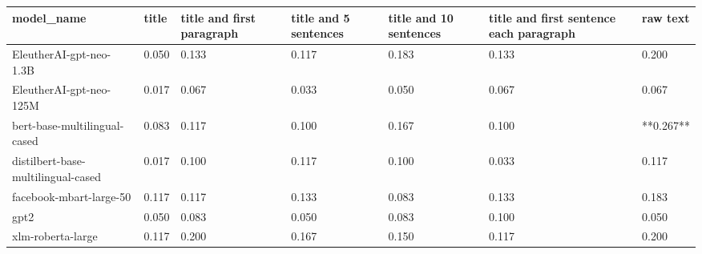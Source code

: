 \begin{tabular}{lllllll}
\toprule
                        model\_name & title & title and first paragraph & title and 5 sentences & title and 10 sentences & title and first sentence each paragraph &  raw text \\
\midrule
           EleutherAI-gpt-neo-1.3B & 0.050 &                     0.133 &                 0.117 &                  0.183 &                                   0.133 &     0.200 \\
           EleutherAI-gpt-neo-125M & 0.017 &                     0.067 &                 0.033 &                  0.050 &                                   0.067 &     0.067 \\
      bert-base-multilingual-cased & 0.083 &                     0.117 &                 0.100 &                  0.167 &                                   0.100 & **0.267** \\
distilbert-base-multilingual-cased & 0.017 &                     0.100 &                 0.117 &                  0.100 &                                   0.033 &     0.117 \\
           facebook-mbart-large-50 & 0.117 &                     0.117 &                 0.133 &                  0.083 &                                   0.133 &     0.183 \\
                              gpt2 & 0.050 &                     0.083 &                 0.050 &                  0.083 &                                   0.100 &     0.050 \\
                 xlm-roberta-large & 0.117 &                     0.200 &                 0.167 &                  0.150 &                                   0.117 &     0.200 \\
\bottomrule
\end{tabular}
